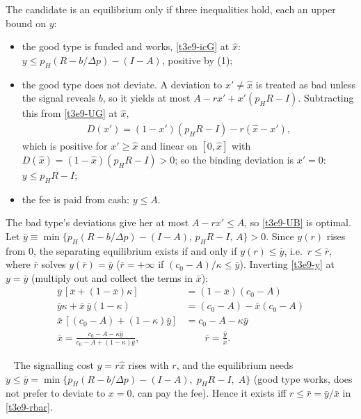 \documentclass[11pt,a4paper]{article}
\newcommand{\answer}[1]{\par\smallskip\noindent\fbox{\textbf{Answer #1.}}~}
\begin{document}
The candidate is an equilibrium only if three inequalities hold, each an upper bound on $y$:
\begin{itemize}
  \item[(E1)] the good type is funded and works, \eqref{t3e9-icG} at $\hat x$: $y\le p_H(R-b/\Delta p)-(I-A)$, positive by (1);
  \item[(E2)] the good type does not deviate. A deviation to $x'\ne\hat x$ is treated as bad unless the signal
     reveals $b$, so it yields at most $A-rx'+x'(p_HR-I)$. Subtracting this from \eqref{t3e9-UG} at $\hat x$,
     \begin{align}
       D(x') = (1-x')(p_HR-I)-r(\hat x-x'), \nonumber
     \end{align}
     which is positive for $x'\ge\hat x$ and linear on $[0,\hat x]$ with $D(\hat x)=(1-\hat x)(p_HR-I)>0$; so
     the binding deviation is $x'=0$: $y\le p_HR-I$;
  \item[(E3)] the fee is paid from cash: $y\le A$.
\end{itemize}
The bad type's deviations give her at most $A-rx'\le A$, so \eqref{t3e9-UB} is optimal. Let
$\bar y\equiv\min\{p_H(R-b/\Delta p)-(I-A),\,p_HR-I,\,A\}>0$. Since $y(r)$ rises from $0$, the
separating equilibrium exists if and only if $y(r)\le\bar y$, i.e.\ $r\le\bar r$, where $\bar r$ solves
$y(\bar r)=\bar y$ ($\bar r=+\infty$ if $(c_0-A)/\kappa\le\bar y$). Inverting \eqref{t3e9-y} at $y=\bar y$ (multiply out and collect the terms in $\bar x$):
\begin{align}
  \bar y\,[\bar x+(1-\bar x)\kappa] &= (1-\bar x)(c_0-A) \nonumber\\
  \bar y\kappa+\bar x\,\bar y(1-\kappa) &= (c_0-A)-\bar x(c_0-A) \nonumber\\
  \bar x\,[(c_0-A)+(1-\kappa)\bar y] &= c_0-A-\kappa\bar y \nonumber\\
  \bar x = \frac{c_0-A-\kappa\bar y}{c_0-A+(1-\kappa)\bar y}, &\qquad \bar r = \frac{\bar y}{\bar x}. \label{t3e9-rbar}
\end{align}

\answer{(ii-4)} The signalling cost $y=r\hat x$ rises with $r$, and the equilibrium needs $y\le\bar y=\min\{p_H(R-b/\Delta p)-(I-A),\;p_HR-I,\;A\}$ (good type works, does not prefer to deviate to $x=0$, can pay the fee). Hence it exists iff $r\le\bar r=\bar y/\bar x$ in \eqref{t3e9-rbar}.
\end{document}
